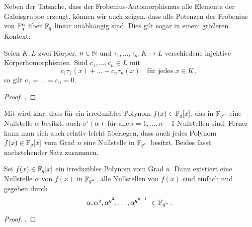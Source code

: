 Neben der Tatsache, dass der Frobenius-Automorphismus 
alle Elemente der Galoisgruppe erzeugt, können wir
auch zeigen, dass alle Potenzen des Frobenius von $\mathbb{F}_q^n$ über $\mathbb{F}_q$ linear
unabhängig sind. Dies gilt sogar in einem größeren Kontext:

\begin{satz}
  \label{satz:dedekindsches_lemma}
  Seien $K,L$ zwei Körper, $n \in \mathbb{N}$ und $\tau_1,\ldots,\tau_n: K\to L$
  verschiedene injektive Körperhomorphismen. 
  Sind $c_1,\ldots,c_n \in L$ mit
  \[ c_1\tau_1(x)+ \ldots+ c_n\tau_n(x)
    \quad\text{für jedes $x\in K$}\,,\]
  so gilt $c_1=\ldots=c_n=0$.
\end{satz}
\begin{proof}
  \autocite[Satz 27.2]{karpfinger2010algebra}.
\end{proof}


Mit  wird klar, dass für ein
irreduzibles Polynom $f(x) \in \mathbb{F}_q[x]$, das in $\mathbb{F}_{q^n}$ eine Nullstelle 
$\alpha$ besitzt, auch $\sigma^i(\alpha)$ für alle $i=1,\ldots,n-1$
Nullstellen sind. Ferner kann man sich auch relativ leicht überlegen, dass auch
jedes Polynom $f(x) \in \mathbb{F}_q[x]$ vom Grad $n$ eine Nullstelle in 
$\mathbb{F}_{q^n}$ besitzt. Beides fasst nachstehender Satz zusammen.

\begin{satz}
  \label{satz:nst_irred_polys}
  Sei $f(x) \in \mathbb{F}_q[x]$ ein irreduzibles Polynom vom Grad $n$. Dann 
  existiert eine Nullstelle $\alpha$ von $f(x)$ in $\mathbb{F}_{q^n}$, alle 
  Nullstellen von $f(x)$ sind einfach und gegeben durch
  \[ \alpha, \alpha^q, \alpha^{q^2}, \ldots, \alpha^{q^{n-1}}\ \in \mathbb{F}_{q^n}\,.\]
\end{satz}
\begin{proof}
  \autocite[Theorem 2.14]{lidl1997finite}.
\end{proof}

